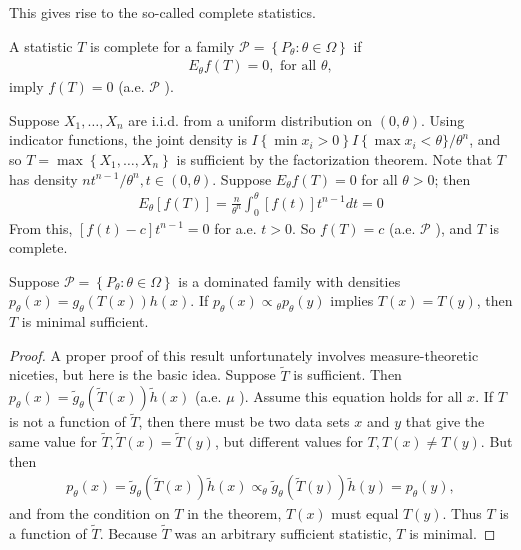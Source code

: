 This gives rise to the so-called complete statistics.

\begin{de}
    A statistic $T$ is complete for a family $\mathcal{P}=\left\{P_\theta: \theta \in \Omega\right\}$ if
\begin{align*}
E_\theta f(T)=0, \text { for all } \theta,
\end{align*}
imply $f(T)=0$ (a.e. $\mathcal{P}$ ).
\end{de}


\begin{eg}
    Suppose $X_1, \ldots, X_n$ are i.i.d. from a uniform distribution on $(0, \theta)$. Using indicator functions, the joint density is $I\left\{\min x_i>0\right\} I\left\{\max x_i<\right. \theta\} / \theta^n$, and so $T=\max \left\{X_1, \ldots, X_n\right\}$ is sufficient by the factorization theorem. Note that $T$ has density $n t^{n-1} / \theta^n, t \in(0, \theta)$. Suppose $E_\theta f(T)=0$ for all $\theta>0$; then
\begin{align*}
E_\theta[f(T)]=\frac{n}{\theta^n} \int_0^\theta[f(t)] t^{n-1} d t=0
\end{align*}
From this, $[f(t)-c] t^{n-1}=0$ for a.e. $t>0$. So $f(T)=c$ (a.e. $\mathcal{P}$ ), and $T$ is complete.
\end{eg}


\begin{thm}
    Suppose $\mathcal{P}=\left\{P_\theta: \theta \in \Omega\right\}$ is a dominated family with densities $p_\theta(x)=g_\theta(T(x)) h(x)$. If $p_\theta(x) \propto{ }_\theta p_\theta(y)$ implies $T(x)=T(y)$, then $T$ is minimal sufficient.
\end{thm}

\begin{proof}
    A proper proof of this result unfortunately involves measure-theoretic niceties, but here is the basic idea. Suppose $\tilde{T}$ is sufficient. Then $p_\theta(x)= \tilde{g}_\theta(\tilde{T}(x)) \tilde{h}(x)$ (a.e. $\mu$ ). Assume this equation holds for all $x$. If $T$ is not a function of $\tilde{T}$, then there must be two data sets $x$ and $y$ that give the same value for $\tilde{T}, \tilde{T}(x)=\tilde{T}(y)$, but different values for $T, T(x) \neq T(y)$. But then
\begin{align*}
p_\theta(x)=\tilde{g}_\theta(\tilde{T}(x)) \tilde{h}(x) \propto_\theta \tilde{g}_\theta(\tilde{T}(y)) \tilde{h}(y)=p_\theta(y),
\end{align*}
and from the condition on $T$ in the theorem, $T(x)$ must equal $T(y)$. Thus $T$ is a function of $\tilde{T}$. Because $\tilde{T}$ was an arbitrary sufficient statistic, $T$ is minimal.
\end{proof}

